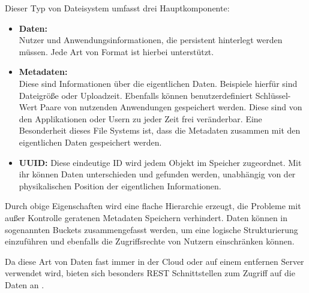 Dieser Typ von Dateisystem umfasst drei Hauptkomponente:

\begin{itemize}
	\item \textbf{Daten:}\\
	 Nutzer und Anwendungsinformationen, die persistent hinterlegt werden müssen. Jede Art von Format ist hierbei unterstützt.
	\item \textbf{Metadaten:}\\
	 Diese sind Informationen über die eigentlichen Daten. Beispiele hierfür sind Dateigröße oder Uploadzeit. Ebenfalls können benutzerdefiniert Schlüssel-Wert Paare von nutzenden Anwendungen gespeichert werden. Diese sind von den Applikationen oder Usern zu jeder Zeit frei veränderbar. Eine Besonderheit dieses File Systems ist, dass die Metadaten zusammen mit den eigentlichen Daten gespeichert werden.
	\item \textbf{\ac{UUID}:} Diese eindeutige ID wird jedem Objekt im Speicher zugeordnet. Mit ihr können Daten unterschieden  und gefunden werden, unabhängig von der physikalischen Position der eigentlichen Informationen.
\end{itemize}

Durch obige Eigenschaften wird eine flache Hierarchie erzeugt, die Probleme mit außer Kontrolle geratenen Metadaten Speichern verhindert. Daten können in sogenannten Buckets zusammengefasst werden, um eine logische Strukturierung einzuführen und ebenfalls die Zugriffsrechte von Nutzern einschränken können.  

Da diese Art von Daten fast immer in der Cloud oder auf einem entfernen Server verwendet wird, bieten sich besonders REST Schnittstellen zum Zugriff auf die Daten an \parencite[S. 4f]{Rios.2017}.

